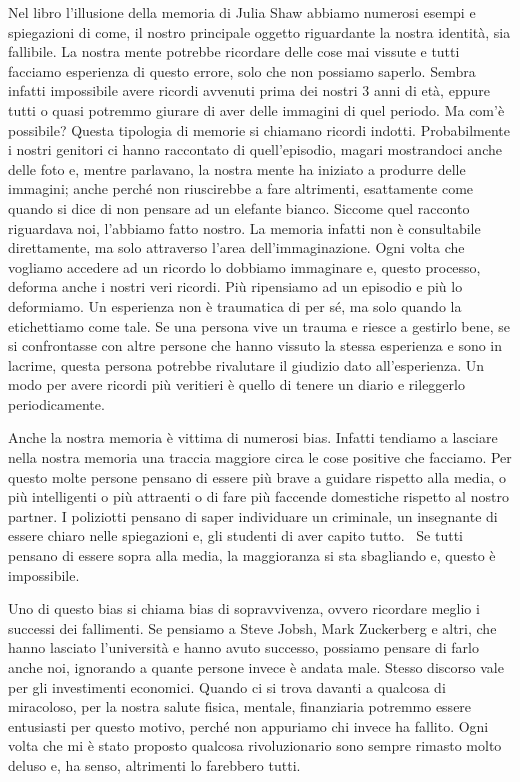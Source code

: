 \documentclass[12pt]{book} %
\begin{document}
\begin{mdframed}[linewidth=1pt]
Nel libro l'illusione della memoria di Julia Shaw abbiamo numerosi esempi
e spiegazioni di come, il nostro principale oggetto riguardante la nostra identità, sia fallibile. La nostra mente
potrebbe ricordare delle cose mai vissute e tutti facciamo esperienza di questo errore, solo che non possiamo saperlo.
Sembra infatti impossibile avere ricordi avvenuti prima dei nostri 3 anni di età, eppure tutti o quasi potremmo giurare
di aver delle immagini di quel periodo. Ma com'è possibile? Questa tipologia di memorie si
chiamano ricordi indotti. Probabilmente i nostri genitori ci hanno raccontato di quell'episodio,
magari mostrandoci anche delle foto e, mentre parlavano, la nostra mente ha iniziato a produrre delle immagini; anche
perché non riuscirebbe a fare altrimenti, esattamente come quando si dice di non pensare ad un elefante bianco. Siccome
quel racconto riguardava noi, l'abbiamo fatto nostro. La memoria infatti non è consultabile
direttamente, ma solo attraverso l'area dell'immaginazione. Ogni volta che
vogliamo accedere ad un ricordo lo dobbiamo immaginare e, questo processo, deforma anche i nostri veri ricordi. Più
ripensiamo ad un episodio e più lo deformiamo. Un esperienza non è traumatica di per sé, ma solo quando la etichettiamo
come tale. Se una persona vive un trauma e riesce a gestirlo bene, se si confrontasse con altre persone che hanno
vissuto la stessa esperienza e sono in lacrime, questa persona potrebbe rivalutare il giudizio dato all'esperienza. Un
modo per avere ricordi più veritieri è quello di tenere un diario e rileggerlo periodicamente.

Anche la nostra memoria è vittima di numerosi bias. Infatti tendiamo a lasciare nella nostra memoria una traccia
maggiore circa le cose positive che facciamo. Per questo molte persone pensano di essere più brave a guidare rispetto
alla media, o più intelligenti o più attraenti o di fare più faccende domestiche rispetto al nostro partner. I
poliziotti pensano di saper individuare un criminale, un insegnante di essere chiaro nelle spiegazioni e, gli studenti
di aver capito tutto. \ Se tutti pensano di essere sopra alla media, la maggioranza si sta sbagliando e, questo è
impossibile.

Uno di questo bias si chiama bias di sopravvivenza, ovvero ricordare meglio i successi dei fallimenti. Se pensiamo a
Steve Jobsh, Mark Zuckerberg e altri, che hanno lasciato l'università e hanno avuto successo, possiamo pensare di farlo
anche noi, ignorando a quante persone invece è andata male. Stesso discorso vale per gli investimenti economici. Quando
ci si trova davanti a qualcosa di miracoloso, per la nostra salute fisica, mentale, finanziaria potremmo essere
entusiasti per questo motivo, perché non appuriamo chi invece ha fallito. Ogni volta che mi è stato proposto qualcosa
rivoluzionario sono sempre rimasto molto deluso e, ha senso, altrimenti lo farebbero tutti.


\end{mdframed}
\end{document}
